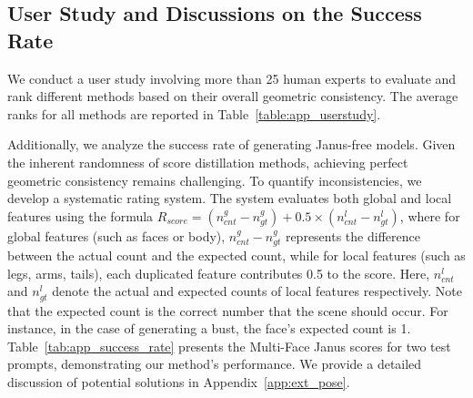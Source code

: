 \subsection{User Study and Discussions on the Success Rate}\label{app:main_exps_study}



We conduct a user study involving more than 25 human experts to evaluate and rank different methods based on their overall geometric consistency. The average ranks for all methods are reported in Table~\ref{table:app_userstudy}.

Additionally, we analyze the success rate of generating Janus-free models. Given the inherent randomness of score distillation methods, achieving perfect geometric consistency remains challenging. To quantify inconsistencies, we develop a systematic rating system. The system evaluates both global and local features using the formula $R_{score} = (n_{cnt}^g-n_{gt}^g) + 0.5\times(n_{cnt}^l-n_{gt}^l)$, where for global features (such as faces or body), $n_{cnt}^g - n_{gt}^g$ represents the difference between the actual count and the expected count, while for local features (such as legs, arms, tails), each duplicated feature contributes 0.5 to the score. Here, $n_{cnt}^l$ and $n_{gt}^l$ denote the actual and expected counts of local features respectively. Note that the expected count is the correct number that the scene should occur. For instance, in the case of generating a bust, the face's expected count is 1. Table~\ref{tab:app_success_rate} presents the Multi-Face Janus scores for two test prompts, demonstrating our method's performance. We provide a detailed discussion of potential solutions in Appendix~\ref{app:ext_pose}.







